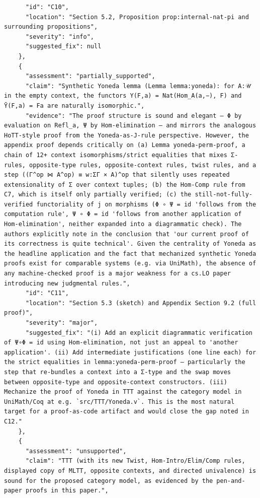 \documentclass[11pt]{article}
\begin{document}
\begin{verbatim}
      "id": "C10",
      "location": "Section 5.2, Proposition prop:internal-nat-pi and surrounding propositions",
      "severity": "info",
      "suggested_fix": null
    },
    {
      "assessment": "partially_supported",
      "claim": "Synthetic Yoneda lemma (Lemma lemma:yoneda): for A:𝒰 in the empty context, the functors Y(F,a) = Nat(Hom_A(a,−), F) and Ȳ(F,a) = Fa are naturally isomorphic.",
      "evidence": "The proof structure is sound and elegant — Φ by evaluation on Refl_a, Ψ by Hom-elimination — and mirrors the analogous HoTT-style proof from the Yoneda-as-J-rule perspective. However, the appendix proof depends critically on (a) Lemma yoneda-perm-proof, a chain of 12+ context isomorphisms/strict equalities that mixes Σ-rules, opposite-type rules, opposite-context rules, twist rules, and a step ((Γ^op ⋈ A^op) ≡ w:ΣΓ × A)^op that silently uses repeated extensionality of Σ over context tuples; (b) the Hom-Comp rule from C7, which is itself only partially verified; (c) the still-not-fully-verified functoriality of j on morphisms (Φ ∘ Ψ = id 'follows from the computation rule', Ψ ∘ Φ = id 'follows from another application of Hom-elimination', neither expanded into a diagrammatic check). The authors explicitly note in the conclusion that 'our current proof of its correctness is quite technical'. Given the centrality of Yoneda as the headline application and the fact that mechanized synthetic Yoneda proofs exist for comparable systems (e.g. via UniMath), the absence of any machine-checked proof is a major weakness for a cs.LO paper introducing new judgmental rules.",
      "id": "C11",
      "location": "Section 5.3 (sketch) and Appendix Section 9.2 (full proof)",
      "severity": "major",
      "suggested_fix": "(i) Add an explicit diagrammatic verification of Ψ∘Φ = id using Hom-elimination, not just an appeal to 'another application'. (ii) Add intermediate justifications (one line each) for the strict equalities in lemma:yoneda-perm-proof — particularly the step that re-bundles a context into a Σ-type and the swap moves between opposite-type and opposite-context constructors. (iii) Mechanize the proof of Yoneda in TTT against the category model in UniMath/Coq at e.g. `src/TTT/Yoneda.v`. This is the most natural target for a proof-as-code artifact and would close the gap noted in C12."
    },
    {
      "assessment": "unsupported",
      "claim": "TTT (with its new Twist, Hom-Intro/Elim/Comp rules, displayed copy of MLTT, opposite contexts, and directed univalence) is sound for the proposed category model, as evidenced by the pen-and-paper proofs in this paper.",

\end{verbatim}
\end{document}
